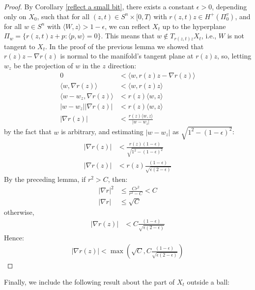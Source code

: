 \begin{proof}
		By Corollary \ref{reflect a small bit}, there exists a constant $ \epsilon > 0 $, depending only on $ X_0 $, such that for all $ (z, t) \in S^n \times [0, T) $ with $ r(z, t) z \in H^+(\Pi_0^v) $, and for all $ w \in S^n $ with $ \langle W, z \rangle > 1 - \epsilon $, we can reflect $ X_t $ up to the hyperplane $ \Pi_w = \{r(z, t) z + p : \langle p , w\rangle=0 \}$. This means that $ w \notin T_{r(z,t) z} X_t $, i.e., $ W $ is not tangent to $ X_t $. In the proof of the previous lemma we showed that $r(z) z - \nabla r(z)$ is normal to the manifold's tangent plane at $r(z) z$, so, letting $w_z$ be the projection of $w$ in the $z$ direction: 
	\begin{align*}
		0&< \langle w, r(z) z - \nabla r(z)  \rangle\\
		\langle w,  \nabla r(z)  \rangle &< \langle w, r(z) z   \rangle\\
		\langle w - w_z,  \nabla r(z)  \rangle &< r(z) \langle w,  z   \rangle\\
		|w - w_z||\nabla r(z)|  &<  r(z) \langle w,  z   \rangle\\
		|\nabla r(z)| &<  \frac{r(z) \langle w,  z   \rangle}{|w - w_z|}
	\end{align*}
	by the fact that $w$ is arbitrary, and estimating $|w - w_z|$ as $\sqrt{1^2 - (1-\epsilon)^2}$:
	\begin{align*}
		|\nabla r(z)|  &<\frac{r(z) (1-\epsilon)}{\sqrt{1^2 - (1-\epsilon)^2}}\\
		|\nabla r(z)|  &<r(z)\frac{ (1-\epsilon)}{\sqrt{\epsilon (2-\epsilon)}}
	\end{align*}
	By the preceding lemma, if $ r^2 > C $, then:
	\begin{align*}
		|\nabla r|^2 &\leq \frac{C r^2}{r^2 - C} < C\\
		|\nabla r| &\leq \sqrt{C}
	\end{align*}
	otherwise, 
	\begin{align*}
		|\nabla r(z)|  &<C\frac{ (1-\epsilon)}{\sqrt{\epsilon (2-\epsilon)}}
	\end{align*}
	Hence:
	\begin{align*}
		|\nabla r(z)| < \max\left(\sqrt{C}, C\frac{ (1-\epsilon)}{\sqrt{\epsilon (2-\epsilon)}}\right)
	\end{align*} 
\end{proof}

Finally, we include the following result about the part of $X_t$ outside a ball: 




